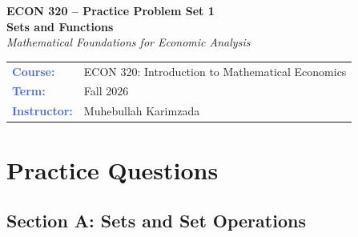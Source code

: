 \documentclass[12pt, a4paper]{article}
\theoremstyle{definition}
\begin{document}

\thispagestyle{empty}

\vspace*{-1.5cm}
\begin{center}
  {\color{white}\large\bfseries\sffamily ECON 320 -- Practice Problem Set 1}\\[10pt]
  {\color{white}\Huge\bfseries Sets and Functions}\\[8pt]
  {\color{gold}\large\itshape Mathematical Foundations for Economic Analysis}
\end{center}

\vspace{3.4cm}

\begin{center}
\begin{tabular}{l l}
  \textbf{\textcolor{royalblue}{Course:}}        & ECON 320: Introduction to Mathematical Economics \\[3pt]


  \textbf{\textcolor{royalblue}{Term:}}          & Fall 2026 \\[3pt]
    \textbf{\textcolor{royalblue}{Instructor:}}          & Muhebullah Karimzada \\[3pt]
\end{tabular}
\end{center}



\newpage


\section{Practice Questions}

\subsection{Section A: Sets and Set Operations}
\end{document}
